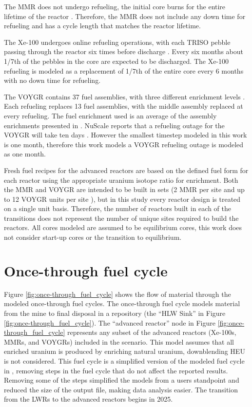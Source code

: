 The \gls{MMR} does not undergo refueling, the initial core
burns for the entire lifetime of the reactor \cite{mitchell_usnc_2020}. 
Therefore, the \gls{MMR}
does not include any down time for refueling and has a cycle length that 
matches the reactor lifetime. 

The Xe-100 undergoes online refueling operations, with each 
\gls{TRISO} pebble passing 
through the reactor six times before discharge \cite{mulder_overview_2021}. 
Every six months about 1/7th 
of the pebbles in the core are expected to be discharged. The Xe-100 
refueling is modeled as a replacement of 1/7th of the entire core every 
6 months with no down time for refueling.  

The VOYGR contains 37 fuel assemblies, with three different enrichment 
levels \cite{nuscale_chapter_2020-1}. Each refueling replaces 13 fuel 
assemblies, with the middle assembly replaced at every refueling. 
The fuel enrichment used is an average of the assembly enrichments 
presented in \cite{nuscale_chapter_2020-1}. NuScale reports that a refueling 
outage for the VOYGR will take ten days \cite{nuscale_nuscale_2022}. However 
the smallest timestep modeled in this work is one month, therefore this 
work models a VOYGR 
refueling outage is modeled as one month. 

Fresh fuel 
recipes for the advanced reactors are based on the 
defined fuel form for each reactor using the appropriate uranium isotope 
ratio for enrichment. Both the \gls{MMR} and VOYGR are intended to be built 
in sets (2 \gls{MMR} per site \cite{noauthor_usnc_2021} and up to 12 VOYGR 
units per site \cite{reyes_nuscale_2021}), but in this study every reactor 
design is treated 
on a single unit basis. Therefore, the number of reactors built in each 
of the transitions does not represent the number of unique sites required 
to build the reactors. All cores modeled are assumed to be equilibrium cores, 
this work does not consider start-up cores or the transition to equilibrium. 

\section{Once-through fuel cycle}
Figure \ref{fig:once-through_fuel_cycle} shows the flow of material through 
the modeled once-through fuel cycles. The once-through fuel cycle models 
material from the mine to final disposal in a repository (the 
``HLW Sink'' in Figure \ref{fig:once-through_fuel_cycle}). The 
``advanced reactor'' node in Figure 
\ref{fig:once-through_fuel_cycle} represents any subset of the advanced 
reactors (Xe-100s, \glspl{MMR}, and VOYGRs) included 
in the scenario. This model assumes that all enriched uranium is produced 
by enriching natural uranium, downblending \gls{HEU} is not considered. 
This fuel cycle is a simplified version of the modeled fuel cycle in 
\cite{bachmann_enrichment_2021}, removing steps in the fuel cycle that 
do not affect the reported results. Removing some of the steps simplified 
the models from a users standpoint and reduced the size of the \Cyclus 
output file, making data analysis easier. The transition from the \glspl{LWR} 
to the advanced reactors begins in 2025. 

